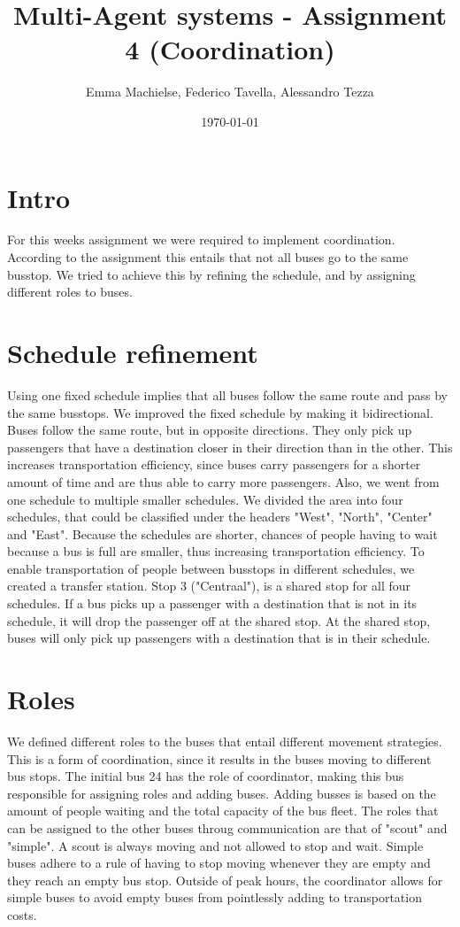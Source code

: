 \documentclass[a4paper]{article}
\title{Multi-Agent systems - Assignment 4 (Coordination)}
\author{Emma Machielse, Federico Tavella, Alessandro Tezza}
\date{\today}
\begin{document}
\section{Intro}
For this weeks assignment we were required to implement coordination. According to the assignment this entails that not all buses go to the same busstop. We tried to achieve this by refining the schedule, and by assigning different roles to buses. 

\section{Schedule refinement}
Using one fixed schedule implies that all buses follow the same route and pass by the same busstops. We improved the fixed schedule by making it bidirectional. Buses follow the same route, but in opposite directions. They only pick up passengers that have a destination closer in their direction than in the other. This increases transportation efficiency, since buses carry passengers for a shorter amount of time and are thus able to carry more passengers. 
\newline
Also, we went from one schedule to multiple smaller schedules. We divided the area into four schedules, that could be classified under the headers "West", "North", "Center" and "East". Because the schedules are shorter, chances of people having to wait because a bus is full are smaller, thus increasing transportation efficiency. To enable transportation of people between busstops in different schedules, we created a transfer station. Stop 3 ("Centraal"), is a shared stop for all four schedules. If a bus picks up a passenger with a destination that is not in its schedule, it will drop the passenger off at the shared stop. At the shared stop, buses will only pick up passengers with a destination that is in their schedule. 

\section{Roles}
We defined different roles to the buses that entail different movement strategies. This is a form of coordination, since it results in the buses moving to different bus stops. The initial bus 24 has the role of coordinator, making this bus responsible for assigning roles and adding buses. Adding busses is based on the amount of people waiting and the total capacity of the bus fleet. The roles that can be assigned to the other buses throug communication are that of "scout" and "simple". A scout is always moving and not allowed to stop and wait. Simple buses adhere to a rule of having to stop moving whenever they are empty and they reach an empty bus stop. Outside of peak hours, the coordinator allows for simple buses to avoid empty buses from pointlessly adding to transportation costs.  
\end{document}
